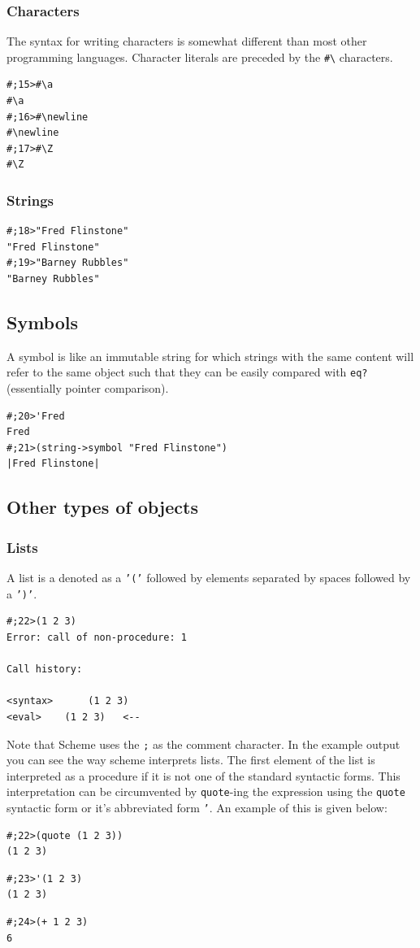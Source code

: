 \documentclass[12pt,a4paper,english,twoside]{article}
\begin{document}
\subsubsection{Characters}
The syntax for writing characters is somewhat different than most other 
programming languages. Character literals are preceded by the 
\texttt{\#\textbackslash} 
characters.
\begin{lstlisting}
#;15>#\a
#\a
#;16>#\newline
#\newline
#;17>#\Z
#\Z
\end{lstlisting}
\subsubsection{Strings}
\begin{lstlisting}
#;18>"Fred Flinstone"
"Fred Flinstone"    
#;19>"Barney Rubbles"
"Barney Rubbles"
\end{lstlisting}
\subsection{Symbols}
A symbol is like an immutable string for which strings with the same content 
will refer to the same object such that they can be easily compared with 
\texttt{eq?} (essentially pointer comparison).
\begin{lstlisting}
#;20>'Fred
Fred
#;21>(string->symbol "Fred Flinstone")
|Fred Flinstone|
\end{lstlisting}
\subsection{Other types of objects}
\subsubsection{Lists}
A list is a denoted as a \texttt{'('} followed by elements separated by spaces followed by a \texttt{')'}.
\begin{lstlisting}
#;22>(1 2 3)
Error: call of non-procedure: 1

Call history:

<syntax>	  (1 2 3)
<eval>	  (1 2 3)	<--

\end{lstlisting}
Note that Scheme uses the \texttt{;} as the comment character. In the example output you can see the way scheme interprets lists. The first element of the list is interpreted as a procedure if it is not one of the standard syntactic forms. This interpretation can be circumvented by \texttt{quote}-ing the expression using the \texttt{quote} syntactic form or it's abbreviated form \texttt{'}. An example of this is given below:
\begin{lstlisting}
#;22>(quote (1 2 3))
(1 2 3)
\end{lstlisting}
\begin{lstlisting}
#;23>'(1 2 3)
(1 2 3)
\end{lstlisting}
\begin{lstlisting}
#;24>(+ 1 2 3)
6
\end{lstlisting}
\end{document}

